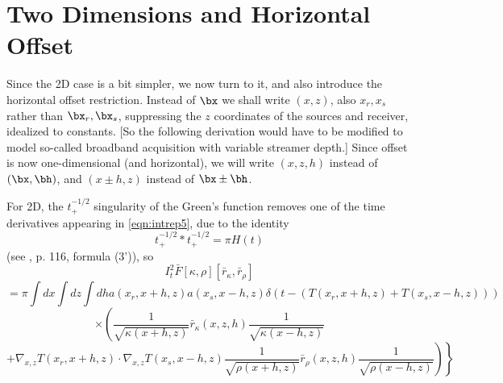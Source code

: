 \section{Two Dimensions and Horizontal Offset}
Since the 2D case is a bit simpler, we now turn to it, and also
introduce the horizontal offset restriction. Instead of $\bx$ we shall
write $(x,z)$, also $x_r,x_s$ rather than $\bx_r,\bx_s$, suppressing
the $z$ coordinates of the sources and receiver, idealized to
constants. [So the following derivation would have to be modified to
model so-called broadband acquisition with variable streamer depth.] 
Since offset is now one-dimensional (and horizontal), we
will write $(x,z,h)$ instead of $(\bx,\bh)$, and $(x\pm h,z)$ instead
of $\bx\pm \bh$.

For 2D, the $t^{-1/2}_+$ singularity of the Green's function removes
one of the time derivatives appearing in \ref{eqn:intrep5}, due to the
identity
\begin{equation}
\label{eqn:convsq}
t_+^{-1/2}*t_+^{-1/2} = \pi H(t)
\end{equation}
(see \cite{GelShil:58}, p. 116, formula (3')), so
\[
I_t^2\bar{F}[\kappa,\rho][\bar{r}_{\kappa},\bar{r}_{\rho}]
\]
\[
= \pi\int dx \int dz \int dh a(x_r,x+h,z) a(x_s,x-h,z) 
\delta(t-(T(x_r,x+h,z)+T(x_s,x-h,z))) 
\]
\[
\times \left(\frac{1}{\sqrt{\kappa(x+h,z)}} \bar{r}_{\kappa}(x,z,h) \frac{1}{\sqrt{\kappa(x-h,z)}}
\right. 
\]
\begin{equation}
\label{eqn:intrep2d}
+\left. \left. 
   \nabla_{x,z}  T(x_r,x+h,z) \cdot \nabla_{x,z} T(x_s,x-h,z) 
\frac{1}{\sqrt{\rho(x+h,z)}}  \bar{r}_{\rho}(x,z,h) \frac{1}{\sqrt{\rho(x-h,z)}}
\right)\right\}
\end{equation}

